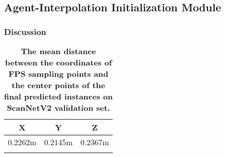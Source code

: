 \subsection{Agent-Interpolation Initialization Module}
\label{aiim}
\subsubsection{Discussion} 
\begin{table}[!ht]
  \begin{center}
    \footnotesize
    \vspace{-1em}
    \setlength\tabcolsep{3pt}
    \caption{\textbf{ The mean distance between the coordinates of FPS sampling points and the center points of the final predicted instances on ScanNetV2 validation set. 
}\vspace{-0.5em}}
    \label{table:meandistance}
    \begin{tabular}{ccc}
      \toprule
    X&	Y	&Z\\
    \midrule
    0.2262m&	0.2145m	&0.2367m\\
      \bottomrule
    \vspace{-2.5em}
    \end{tabular}
  \end{center}

\end{table}

